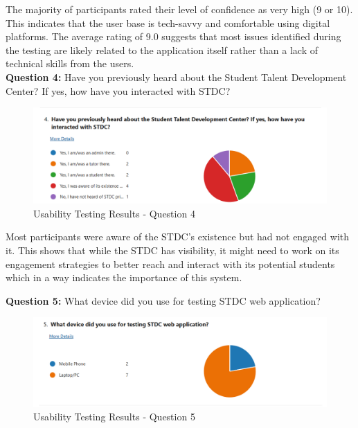 \begin{justify}
\vspace{0.25cm}
\newendline The majority of participants rated their level of confidence as very high (9 or 10). This indicates that the user base is tech-savvy and comfortable using digital platforms. The average rating of 9.0 suggests that most issues identified during the testing are likely related to the application itself rather than a lack of technical skills from the users.\\

\vspace{-0.25cm}
\newendline \textbf{Question 4:} Have you previously heard about the Student Talent Development Center? If yes, how have you interacted with STDC?

\begin{figure}[H]
    \centerline{\includegraphics[width=150mm,scale=1]{figures/implementation_and_testing/testing/MUT/answers/Answers (4).png}}
    \caption{Usability Testing Results - Question 4}
    \label{Usability Testing Results - Question 4}
\end{figure}

\vspace{0.25cm}
\newendline Most participants were aware of the STDC's existence but had not engaged with it. This shows that while the STDC has visibility, it might need to work on its engagement strategies to better reach and interact with its potential students which in a way indicates the importance of this system.

\vspace{0.25cm}
\newendline \textbf{Question 5:} What device did you use for testing STDC web application?

\begin{figure}[H]
    \centerline{\includegraphics[width=150mm,scale=1]{figures/implementation_and_testing/testing/MUT/answers/Answers (5).png}}
    \caption{Usability Testing Results - Question 5}
    \label{Usability Testing Results - Question 5}
\end{figure}


\end{justify}
